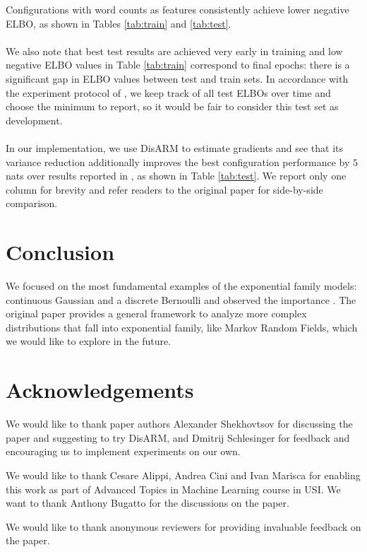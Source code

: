 Configurations with word counts as features consistently achieve lower negative ELBO, as shown in Tables \ref{tab:train} and \ref{tab:test}.

\paragraph{} We also note that best test results are achieved very early in training and low negative ELBO values in Table \ref{tab:train} correspond to final epochs: there is a significant gap in ELBO values between test and train sets. In accordance with the experiment protocol of \cite{shekhovtsov2022vae}, we keep track of all test ELBOs over time and choose the minimum to report, so it would be fair to consider this test set as development.

\paragraph{} In our implementation, we use DisARM to estimate gradients and see that its variance reduction additionally improves the best configuration performance by $5$ nats over results reported in \cite{shekhovtsov2022vae}, as shown in Table \ref{tab:test}. We report only one column for brevity and refer readers to the original paper for side-by-side comparison.

\section{Conclusion}

We focused on the most fundamental examples of the exponential family models: continuous Gaussian and a discrete Bernoulli and observed the importance . The original paper provides a general framework to analyze more complex distributions that fall into exponential family, like Markov Random Fields, which we would like to explore in the future.

\section{Acknowledgements}

We would like to thank paper authors Alexander Shekhovtsov for discussing the paper and suggesting to try DisARM, and Dmitrij Schlesinger for feedback and encouraging us to implement experiments on our own.

We would like to thank Cesare Alippi, Andrea Cini and Ivan Marisca for enabling this work as part of Advanced Topics in Machine Learning course in USI. We want to thank Anthony Bugatto for the discussions on the paper.

We would like to thank anonymous reviewers for providing invaluable feedback on the paper.